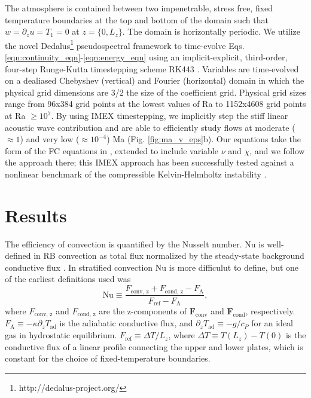 \documentclass[aps, prl, twocolumn, nofootinbib, groupedaddress, amsfonts, amssymb, amsmath]{revtex4-1}
\begin{document}
The atmosphere is contained between two impenetrable, stress free, fixed temperature boundaries at
the top and bottom of the domain such that $w = \partial_z u = T_1 = 0$ at $z = \{0, L_z\}$. The domain
is horizontally periodic. We utilize the novel Dedalus\footnote{http://dedalus-project.org/} pseudospectral framework 
 to time-evolve Eqs. 
\ref{eqn:continuity_eqn}-\ref{eqn:energy_eqn} using an implicit-explicit, third-order, four-step 
Runge-Kutta timestepping scheme RK443 \cite{ascher&all1997}.  
Variables are time-evolved on a dealiased Chebyshev (vertical)
and Fourier (horizontal) domain in which the
physical grid dimensions are 3/2 the size of the coefficient grid.  Physical grid sizes range from
96x384 grid points at the lowest values of Ra to 1152x4608 grid points at Ra $\geq 10^{7}$. 
By using IMEX timestepping, we implicitly step the stiff linear acoustic wave contribution and are able to
efficiently study flows at moderate ($\approx 1$) and very low ($\approx 10^{-4}$)
Ma (Fig. \ref{fig:ma_v_eps}b).  Our equations take the form
of the FC equations in \cite{lecoanet&all2014}, extended to include variable
$\nu$ and $\chi$, and we follow the approach there; this IMEX approach has been successfully 
tested against a nonlinear benchmark  of the compressible Kelvin-Helmholtz instability \cite{Lecoanet_et_al_2016_KH}.

\section{Results}
\label{sec:results}

The efficiency of convection is quantified by the Nusselt number.  
Nu is well-defined in RB convection
as total flux normalized by the steady-state background conductive flux 
\cite{johnston&doering2009, otero&all2002}.
In stratified convection Nu is more difficulut to define, but one of the earliest definitions used
was \cite{graham1975,hurlburt&all1984}
\begin{equation}
\text{Nu} \equiv \frac{F_{\text{conv, z}} + F_{\text{cond, z}} - F_{\text{A}}}{F_{\text{ref}} - F_{\text{A}}},
\label{eqn:nusselt}
\end{equation}
where $F_{\text{conv, z}}$ and $F_{\text{cond, z}}$ are the z-components of $\bm{F}_{\text{conv}}$ and $\bm{F}_{\text{cond}}$,
respectively.  $F_{\text{A}} \equiv -\kappa \partial_z T_{\text{ad}}$ is the adiabatic conductive flux, and
$\partial_z T_{\text{ad}} \equiv - g / c_{P}$ for an ideal gas in hydrostatic equilibrium.
$F_{\text{ref}} \equiv \Delta T / L_z$, where $\Delta T \equiv T(L_z) - T(0)$ is the 
conductive flux of a linear profile connecting the upper
and lower plates, which is constant for the choice of fixed-temperature boundaries.
\end{document}
